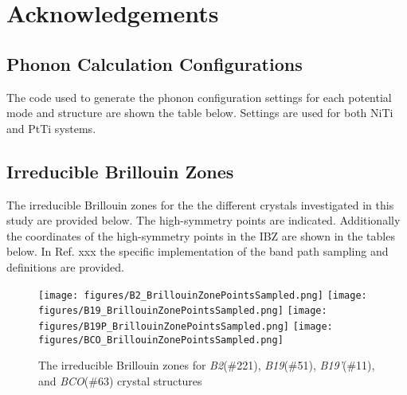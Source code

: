 \documentclass[preprint]{elsarticle}
\begin{document}
\section*{Acknowledgements}

\appendix
\subsection{Phonon Calculation Configurations}
\label{sec:phonon_calc_config}

The code used to generate the phonon configuration settings for each potential mode and structure are shown the table below. Settings are used for both NiTi and PtTi systems.


\subsection{Irreducible Brillouin Zones}
\label{sec:appx_ibz}

The irreducible Brillouin zones for the the different crystals investigated in this study are provided below. The high-symmetry points are indicated. Additionally the coordinates of the high-symmetry points in the IBZ are shown in the tables below. In Ref. xxx the  specific implementation of the band path sampling and definitions are provided.

\begin{figure}[!htp]                                                                                      
    \begin{centering}                                                                                    
      \texttt{[image: figures/B2\_BrillouinZonePointsSampled.png]} 
      \vspace{1mm}                                                                                       
      \texttt{[image: figures/B19\_BrillouinZonePointsSampled.png]}
      \vspace{1mm}
      \texttt{[image: figures/B19P\_BrillouinZonePointsSampled.png]}
      \vspace{1mm}
      \texttt{[image: figures/BCO\_BrillouinZonePointsSampled.png]}
      \vspace{1mm}                                                                                       
      \caption{The irreducible Brillouin zones for \textit{B2}(\#221), \textit{B19}(\#51), \textit{B19'}(\#11), and \textit{BCO}(\#63) crystal structures}                                                               \label{fig:ibz}                                                                          
    \end{centering}                                                                                      
\end{figure} 

\end{document}
